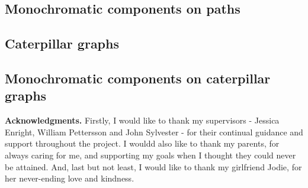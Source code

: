 \documentclass{mpaper}
\begin{document}
\subsection{Monochromatic components on paths}

\subsection{Caterpillar graphs}

\subsection{Monochromatic components on caterpillar graphs}


{\bf Acknowledgments.}
Firstly, I would like to thank my supervisors - Jessica Enright, William Pettersson and John Sylvester - for their continual guidance and support throughout the project. I wouldd also like to thank my parents, for always caring for me, and supporting my goals when I thought they could never be attained. And, last but not least, I would like to thank my girlfriend Jodie, for her never-ending love and kindness.



\end{document}
